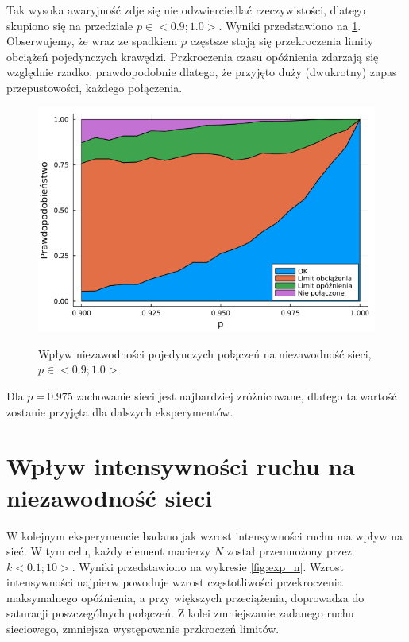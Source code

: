 \documentclass{article}
\begin{document}
    Tak wysoka awaryjność zdje się nie odzwierciedlać rzeczywistości, dlatego skupiono się na przedziale $p \in <0.9; 1.0>$. Wyniki przedstawiono na \ref{fig:exp_p}. Obserwujemy, że wraz ze spadkiem $p$ częstsze stają się przekroczenia limity obciążeń pojedynczych krawędzi. Przkroczenia czasu opóźnienia zdarzają się względnie rzadko, prawdopodobnie dlatego, że przyjęto duży (dwukrotny) zapas przepustowości, każdego połączenia. 


    \begin{figure}[h]
        \centering
        \includegraphics[width=12cm]{../experiment_p.png}
        \label{fig:exp_p}
        \caption{Wpływ niezawodności pojedynczych połączeń na niezawodność sieci, $p\in<0.9;1.0>$}
    \end{figure}

    Dla $p=0.975$ zachowanie sieci jest najbardziej zróżnicowane, dlatego ta wartość zostanie przyjęta dla dalszych eksperymentów.

    \newpage
    \section{Wpływ intensywności ruchu na niezawodność sieci}
    W kolejnym eksperymencie badano jak wzrost intensywności ruchu ma wpływ na sieć. W tym celu, każdy element macierzy $N$ został przemnożony przez $k <0.1; 10>$. Wyniki przedstawiono na wykresie \ref{fig:exp_n}. Wzrost intensywności najpierw powoduje wzrost częstotliwości przekroczenia maksymalnego opóźnienia, a przy większych przeciążenia, doprowadza do saturacji poszczególnych połączeń. Z kolei zmniejszanie zadanego ruchu sieciowego, zmniejsza występowanie przkroczeń limitów.
\end{document}
